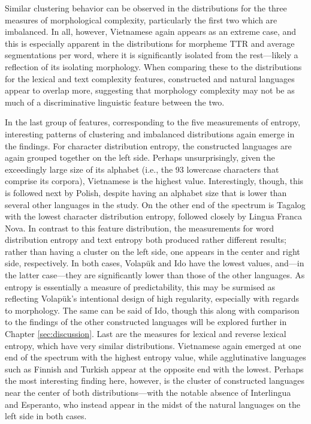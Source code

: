\documentclass[12pt,a4paper]{article}
\numberwithin{figure}{section}
\numberwithin{table}{section}
\numberwithin{definition}{section}
\begin{document}
Similar clustering behavior can be observed in the distributions for the three measures of morphological complexity, particularly the first two which are imbalanced. In all, however, Vietnamese again appears as an extreme case, and this is especially apparent in the distributions for morpheme TTR and average segmentations per word, where it is significantly isolated from the rest---likely a reflection of its isolating morphology. When comparing these to the distributions for the lexical and text complexity features, constructed and natural languages appear to overlap more, suggesting that morphology complexity may not be as much of a discriminative linguistic feature between the two.

In the last group of features, corresponding to the five measurements of entropy, interesting patterns of clustering and imbalanced distributions again emerge in the findings. For character distribution entropy, the constructed languages are again grouped together on the left side. Perhaps unsurprisingly, given the exceedingly large size of its alphabet (i.e., the 93 lowercase characters that comprise its corpora), Vietnamese is the highest value. Interestingly, though, this is followed next by Polish, despite having an alphabet size that is lower than several other languages in the study. On the other end of the spectrum is Tagalog with the lowest character distribution entropy, followed closely by Lingua Franca Nova. In contrast to this feature distribution, the measurements for word distribution entropy and text entropy both produced rather different results; rather than having a cluster on the left side, one appears in the center and right side, respectively. In both cases, Volapük and Ido have the lowest values, and---in the latter case---they are significantly lower than those of the other languages. As entropy is essentially a measure of predictability, this may be surmised as reflecting Volapük's intentional design of high regularity, especially with regards to morphology. The same can be said of Ido, though this along with comparison to the findings of the other constructed languages will be explored further in Chapter \ref{sec:discussion}. Last are the measures for lexical and reverse lexical entropy, which have very similar distributions. Vietnamese again emerged at one end of the spectrum with the highest entropy value, while agglutinative languages such as Finnish and Turkish appear at the opposite end with the lowest. Perhaps the most interesting finding here, however, is the cluster of constructed languages near the center of both distributions---with the notable absence of Interlingua and Esperanto, who instead appear in the midst of the natural languages on the left side in both cases.
\end{document}
